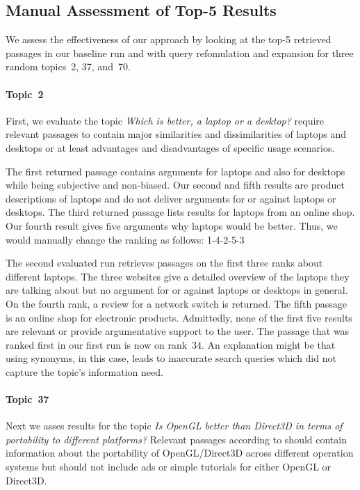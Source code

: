 \subsection{Manual Assessment of Top-5 Results}

We assess the effectiveness of our approach by looking at the top-5 retrieved passages in our baseline run and with query refomulation and expansion for three random topics~2, 37, and~70.

\paragraph{Topic~2}

First, we evaluate the topic \textit{Which is better, a laptop or a desktop?}
\citet{BondarenkoFKSGBPBSWPH2022} require relevant passages to contain major similarities and dissimilarities of laptops and desktops or at least advantages and disadvantages of specific usage scenarios.

The first returned passage contains arguments for laptops and also for desktops while being subjective and non-biased.
Our second and fifth results are product descriptions of laptops and do not deliver arguments for or against laptops or desktops.
The third returned passage lists results for laptops from an online shop.
Our fourth result gives five arguments why laptops would be better.
Thus, we would manually change the ranking as follows: 1-4-2-5-3

The second evaluated run retrieves passages on the first three ranks about different laptops.
The three websites give a detailed overview of the laptops they are talking about but no argument for or against laptops or desktops in general.
On the fourth rank, a review for a network switch is returned.
The fifth passage is an online shop for electronic products.
Admittedly, none of the first five results are relevant or provide argumentative support to the user.
The passage that was ranked first in our first run is now on rank~34.
An explanation might be that using synonyms, in this case, leads to inaccurate search queries which did not capture the topic's information need.

\paragraph{Topic~37}

Next we asses results for the topic
\textit{Is OpenGL better than Direct3D in terms of portability to different platforms?}
Relevant passages according to \citet{BondarenkoFKSGBPBSWPH2022} should contain information about the portability of OpenGL/Direct3D across different operation systems but should not include ads or simple tutorials for either OpenGL or Direct3D.

